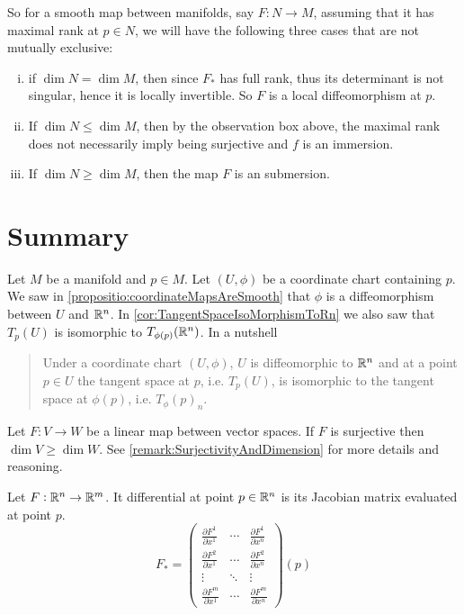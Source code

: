 So for a smooth map between manifolds, say $ F: N\to M $, assuming that it has maximal rank at $ p \in N $, we will have the following three cases that are not mutually exclusive:
\begin{enumerate}[(i)]
	\item if $ \dim N = \dim M $, then since $ F_* $ has full rank, thus its determinant is not singular, hence it is locally invertible. So $ F $ is a local diffeomorphism at $ p $.
	\item If $ \dim N \leq \dim M $, then by the observation box above, the maximal rank does not necessarily imply being surjective and $ f $ is an immersion.
	\item If $ \dim N \geq \dim M $, then the map $ F $ is an submersion.
\end{enumerate}



\newpage


\section{Summary}
\begin{summary}
	Let $ M $ be a manifold and $ p \in M $. Let $ (U,\phi) $ be a coordinate chart containing $ p $. We saw in \autoref{propositio:coordinateMapsAreSmooth} that $ \phi $ is a diffeomorphism between $ U $ and $ \mathbb{R}^n $. In \autoref{cor:TangentSpaceIsoMorphismToRn} we also saw that $ T_p(U) $ is isomorphic to $ T_{\phi(p)}(\mathbb{R}^n) $. In a nutshell
	\begin{quote}
		Under a coordinate chart $ (U,\phi) $, $ U $ is diffeomorphic to $ \mathbb{R}^n $ and at a point $ p \in U $ the tangent space at $ p $, i.e. $ T_p(U) $, is isomorphic to the tangent space at $ \phi(p) $, i.e. $ T_\phi(p)_n $.
	\end{quote}
\end{summary}

\begin{summary}
	Let $ F: V \to W $ be a linear map between vector spaces. If $ F $ is surjective then $ \dim V \geq \dim W $. See \autoref{remark:SurjectivityAndDimension} for more details and reasoning.
\end{summary}


\begin{summary}
	Let $ F: \mathbb{R}^n \to \mathbb{R}^m $. It differential at point $ p \in \mathbb{R}^n $ is its Jacobian matrix evaluated at point $ p $.
	\[ F_* = 
	\begin{pmatrix}
		\frac{\partial F^1}{\partial x^1} & \cdots & \frac{\partial F^1}{\partial x^n} \\
		\frac{\partial F^2}{\partial x^1} & \cdots & \frac{\partial F^2}{\partial x^n} \\
		\vdots & \ddots & \vdots \\
		\frac{\partial F^m}{\partial x^1} & \cdots & \frac{\partial F^m}{\partial x^n}
	\end{pmatrix}(p)
	 \]
\end{summary}

